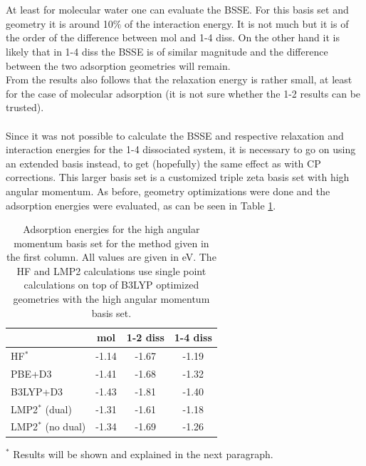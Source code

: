 \documentclass[11pt,DIV=13,BCOR=5mm,a4paper,headinclude]{scrbook}
\begin{document}
\\
\\
At least for molecular water one can evaluate the BSSE.
For this basis set and geometry it is around 10$\%$ of the interaction
energy.
It is not much but it is of the order of the difference between mol and 1-4 diss.
On the other hand it is likely that in 1-4 diss the BSSE is of similar magnitude and the difference between the two adsorption geometries will remain.
\\
From the results also follows that the relaxation energy is rather small, at least for the case of molecular adsorption (it is not sure whether the 1-2 results can be trusted).
\\\\
Since it was not possible to calculate the BSSE and respective relaxation and interaction energies for the 1-4 dissociated system, it is necessary to go on using an extended basis instead, to get (hopefully) the same effect as with CP corrections.
This larger basis set is a customized triple zeta basis set with high angular momentum.
As before, geometry optimizations were done and the adsorption energies were evaluated, as can be seen in Table \ref{tab:combined_results}.
\begin{table}[!h]
  \centering
   \caption{Adsorption energies for the high angular momentum basis set for the method given in the first column.
All values are given in eV. The HF and LMP2 calculations use single point calculations on top of B3LYP optimized geometries with the high angular momentum basis set.}
  \begin{tabular}{l|ccc}
  \toprule
   &mol & 1-2 diss & 1-4 diss \\\midrule
HF$^\ast$ &-1.14 & -1.67 & -1.19\\
PBE+D3 & -1.41 & -1.68 & -1.32 \\
B3LYP+D3 & -1.43 & -1.81 & -1.40 \\
LMP2$^\ast$ (dual) & -1.31 & -1.61 & -1.18 \\ %
LMP2$^\ast$ (no dual) & -1.34 & -1.69 & -1.26\\\bottomrule
  \end{tabular}
  \begin{tablenotes}
 \footnotesize
\item[] $^\ast$ Results will be shown and explained in the next paragraph.
  \end{tablenotes}
  \label{tab:combined_results}
\end{table}
\\
\end{document}
